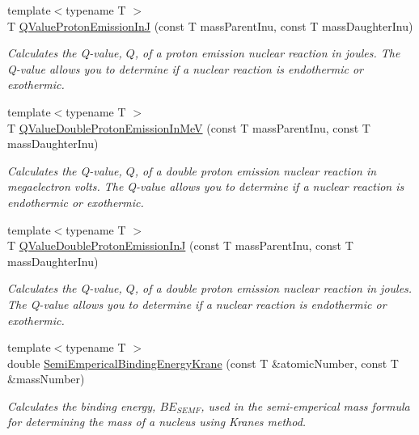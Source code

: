 \begin{DoxyCompactItemize}
{\footnotesize template$<$typename T $>$ }\\T \mbox{\hyperlink{group___e_g_x_phys-_q_value-_proton_emission_ga41f19b0d9a2dc06e89de44aaa2d48d62}{Q\+Value\+Proton\+Emission\+InJ}} (const T mass\+Parent\+Inu, const T mass\+Daughter\+Inu)
\begin{DoxyCompactList}\small\item\em Calculates the Q-\/value, $Q$, of a proton emission nuclear reaction in joules. The Q-\/value allows you to determine if a nuclear reaction is endothermic or exothermic. \end{DoxyCompactList}\item 
{\footnotesize template$<$typename T $>$ }\\T \mbox{\hyperlink{group___e_g_x_phys-_q_value-_proton_emission_ga61d07711da603f2f4426fbb3f271fc34}{Q\+Value\+Double\+Proton\+Emission\+In\+MeV}} (const T mass\+Parent\+Inu, const T mass\+Daughter\+Inu)
\begin{DoxyCompactList}\small\item\em Calculates the Q-\/value, $Q$, of a double proton emission nuclear reaction in megaelectron volts. The Q-\/value allows you to determine if a nuclear reaction is endothermic or exothermic. \end{DoxyCompactList}\item 
{\footnotesize template$<$typename T $>$ }\\T \mbox{\hyperlink{group___e_g_x_phys-_q_value-_proton_emission_gab8979dd25aeac115834a4a8b233fec6f}{Q\+Value\+Double\+Proton\+Emission\+InJ}} (const T mass\+Parent\+Inu, const T mass\+Daughter\+Inu)
\begin{DoxyCompactList}\small\item\em Calculates the Q-\/value, $Q$, of a double proton emission nuclear reaction in joules. The Q-\/value allows you to determine if a nuclear reaction is endothermic or exothermic. \end{DoxyCompactList}\item 
{\footnotesize template$<$typename T $>$ }\\double \mbox{\hyperlink{group___e_g_x_phys-_semi_empirical_mass_formula_ga99c5a87be2c76d3fa4852654c3fd59a9}{Semi\+Emperical\+Binding\+Energy\+Krane}} (const T \&atomic\+Number, const T \&mass\+Number)
\begin{DoxyCompactList}\small\item\em Calculates the binding energy, $BE_{SEMF}$, used in the semi-\/emperical mass formula for determining the mass of a nucleus using Krane\textquotesingle{}s method. \end{DoxyCompactList}\item 

\end{DoxyCompactItemize}
